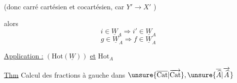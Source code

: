 (donc carré cartésien et cocartésien, car $Y'\longrightarrow X'$ )


alors 
\[
i\in\underline W_A\Rightarrow i'\in\underline W_A
\]
\[
g\in\underline W_A\Rightarrow f\in\underline W_A
\]

 \uline{Application :} $(\mathrm{Hot}(\underline W))$ \uline{et} $\mathrm{Hot}_A$

\uline{Thm} Calcul des fractions à gauche dans $\unsure{\overline{\mathrm{Cat}}|\overrightarrow{\mathrm{Cat}}},\unsure{\overline{\widehat A}|\overrightarrow{\widehat A}}$
